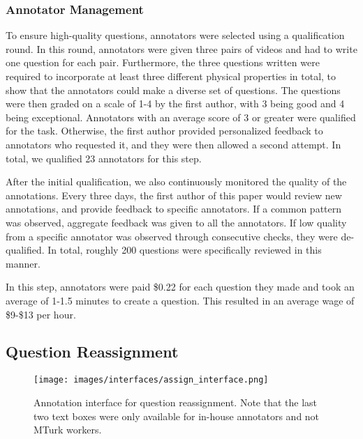 \documentclass[runningheads]{llncs}
\begin{document}
\subsubsection{Annotator Management} To ensure high-quality questions, annotators were selected using a qualification round. In this round, annotators were given three pairs of videos and had to write one question for each pair. Furthermore, the three questions written were required to incorporate at least three different physical properties in total, to show that the annotators could make a diverse set of questions. The questions were then graded on a scale of 1-4 by the first author, with 3 being good and 4 being exceptional. Annotators with an average score of 3 or greater were qualified for the task. Otherwise, the first author provided personalized feedback to annotators who requested it, and they were then allowed a second attempt. In total, we qualified 23 annotators for this step. 

After the initial qualification, we also continuously monitored the quality of the annotations. Every three days, the first author of this paper would review new annotations, and provide feedback to specific annotators. If a common pattern was observed, aggregate feedback was given to all the annotators. If low quality from a specific annotator was observed through consecutive checks, they were de-qualified. In total, roughly 200 questions were specifically reviewed in this manner. 

In this step, annotators were paid \$0.22 for each question they made and took an average of 1-1.5 minutes to create a question. This resulted in an average wage of \$9-\$13 per hour. 

\subsection{Question Reassignment} \label{appendix:q_reassign}

\begin{figure}[t]
    \centering
  \texttt{[image: images/interfaces/assign\_interface.png]}
  \caption{Annotation interface for question reassignment. Note that the last two text boxes were only available for in-house annotators and not MTurk workers.}
  \label{fig:assign_interface}
\end{figure}
\end{document}
